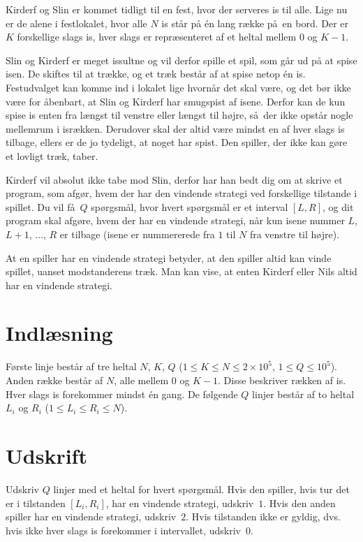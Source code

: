 
Kirderf og Slin er kommet tidligt til en fest, hvor der serveres is til alle.
Lige nu er de alene i festlokalet, hvor alle $N$ is står på én lang række på en bord.
Der er $K$ forskellige slags is, hver slags er repræsenteret af et heltal mellem $0$ og $K-1$.


Slin og Kirderf er meget issultne og vil derfor spille et spil, som går ud på at spise isen.
De skiftes til at trække, og et træk består af at spise netop én is.
Festudvalget kan komme ind i lokalet lige hvornår det skal være, og det bør ikke være for åbenbart, at Slin og Kirderf har smugspist af isene.
Derfor kan de kun spise is enten fra længst til venstre eller længst til højre, så der ikke opstår nogle mellemrum i isrækken.
Derudover skal der altid være mindst en af hver slags is tilbage, ellers er de jo tydeligt, at noget har spist.
Den spiller, der ikke kan gøre et lovligt træk, taber.

Kirderf vil absolut ikke tabe mod Slin, derfor har han bedt dig om at skrive et program, som afgør, hvem der har den vindende strategi ved forskellige tilstande i spillet.
Du vil få $Q$ spørgsmål, hvor hvert spørgsmål er et interval $[L,R]$, og dit program skal afgøre, hvem der har en vindende strategi, når kun isene nummer $L$, $L+1$, $\dots$, $R$ er tilbage (isene er nummererede fra $1$ til $N$ fra venstre til højre).

At en spiller har en vindende strategi betyder, at den spiller altid kan vinde spillet, uanset modstanderens træk.
Man kan vise, at enten Kirderf eller Nils altid har en vindende strategi.

\section*{Indlæsning}

Første linje består af tre heltal $N$, $K$, $Q$ ($1 \le K \le N \le 2 \times 10^5$, $1 \le Q \le 10^5$).
Anden række består af $N$, alle mellem $0$ og $K-1$.
Disse beskriver rækken af is.
Hver slags is forekommer mindst én gang.
De følgende $Q$ linjer består af  to heltal $L_i$ og $R_i$ ($1 \le L_i \le R_i \le N$).

\section*{Udskrift}

Udskriv $Q$ linjer med et heltal for hvert spørgsmål.
Hvis den spiller, hvis tur det er i tilstanden $[L_i, R_i]$, har en vindende strategi, udskriv~$1$.
Hvis den anden spiller har en vindende strategi, udskriv~$2$.
Hvis tilstanden ikke er gyldig, dvs. hvis ikke hver slags is forekommer i intervallet, udskriv~$0$.

